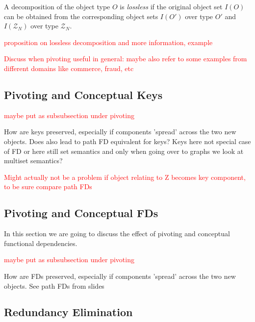 \documentclass[sigconf]{acmart}
\begin{document}
\begin{definition}
\label{def:lossless}
A decomposition of the object type $O$ is \emph{lossless} if the original object set $I(O)$ can be obtained from the corresponding object sets $I(O')$ over type $O'$ and $I(\mathcal{Z}_N)$ over type $\mathcal{Z}_N$.
\end{definition}

\textcolor{red}{proposition on lossless decomposition and more information, example}



\textcolor{red}{Discuss when pivoting useful in general: maybe also refer to some examples from different domains like commerce, fraud, etc}







\subsection{Pivoting and Conceptual Keys}

\textcolor{red}{maybe put as subsubsection under pivoting}

How are keys preserved, especially if components 'spread' across the two new objects. Does also lead to path FD equivalent for keys? Keys here not special case of FD or here still set semantics and only when going over to graphs we look at multiset semantics?

\textcolor{red}{Might actually not be a problem if object relating to Z becomes key component, to be sure compare path FDs}




\subsection{Pivoting and Conceptual FDs}

In this section we are going to discuss the effect of pivoting and conceptual functional dependencies.

\textcolor{red}{maybe put as subsubsection under pivoting}

How are FDs preserved, especially if components 'spread' across the two new objects. See path FDs from slides



\subsection{Redundancy Elimination}
\end{document}
